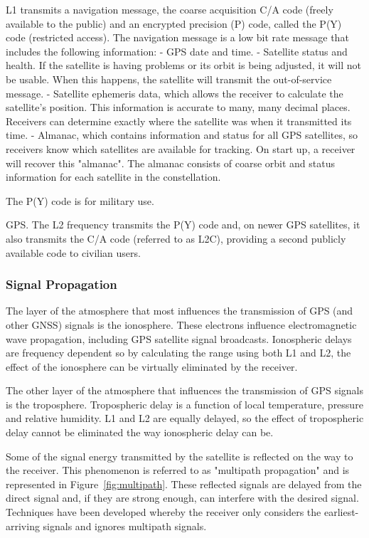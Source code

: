 L1 transmits a navigation message, the coarse acquisition C/A code (freely available to the public) and an encrypted precision (P) code, called the P(Y) code (restricted access). The navigation message is a low bit rate message that includes the following information:
- GPS date and time.
- Satellite status and health. If the satellite is having problems or its orbit is being adjusted, it will not be usable. When this happens, the satellite will transmit the out-of-service message.
- Satellite ephemeris data, which allows the receiver to calculate the satellite's position. This information is accurate to many, many decimal places. Receivers can determine exactly where the satellite was when it transmitted its time.
- Almanac, which contains information and status for all GPS satellites, so receivers know which satellites are available for tracking. On start up, a receiver will recover this "almanac".
The almanac consists of coarse orbit and status information for each satellite in the constellation.

The P(Y) code is for military use.

GPS. The L2 frequency transmits the P(Y) code and, on newer GPS satellites, it also transmits the C/A code (referred to as L2C), providing a second publicly available code to civilian users.

\subsubsection{Signal Propagation}\label{sec:II_gnss_comm_propag}

The layer of the atmosphere that most influences the transmission of GPS (and other GNSS) signals is the ionosphere. These electrons influence electromagnetic wave propagation, including GPS satellite signal broadcasts. Ionospheric delays are frequency dependent so by calculating the range using both L1 and L2, the effect of the ionosphere can be virtually eliminated by the receiver.

The other layer of the atmosphere that influences the transmission of GPS signals is the troposphere. Tropospheric delay is a function of local temperature, pressure and relative humidity. L1 and L2 are equally delayed, so the effect of tropospheric delay cannot be eliminated the way ionospheric delay can be.

Some of the signal energy transmitted by the satellite is reflected on the way to the receiver. This phenomenon is referred to as "multipath propagation" and is represented in Figure~\ref{fig:multipath}. These reflected signals are delayed from the direct signal and, if they are strong enough, can interfere with the desired signal. Techniques have been developed whereby the receiver only considers the earliest-arriving signals and ignores multipath signals.


